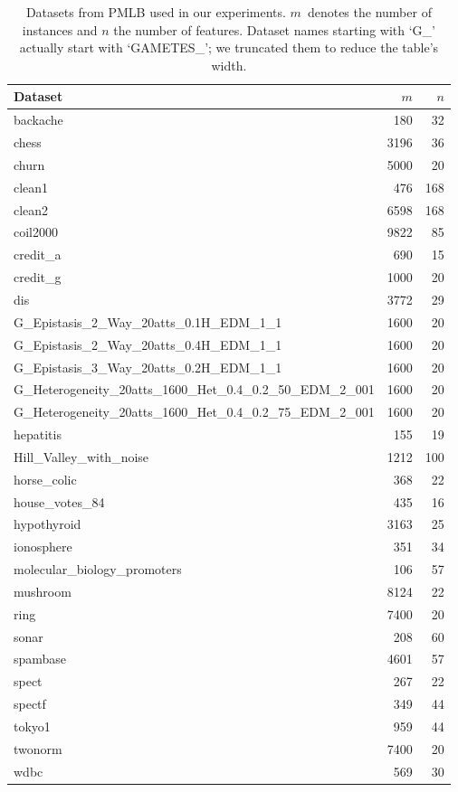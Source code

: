 \documentclass{article}
\theoremstyle{definition}
\begin{document}
\begin{table}[htbp]
	\centering
	\begin{tabular}{lrr}
		\toprule
		Dataset & $m$ & $n$ \\
		\midrule
		backache & 180 & 32 \\
		chess & 3196 & 36 \\
		churn & 5000 & 20 \\
		clean1 & 476 & 168 \\
		clean2 & 6598 & 168 \\
		coil2000 & 9822 & 85 \\
		credit\_a & 690 & 15 \\
		credit\_g & 1000 & 20 \\
		dis & 3772 & 29 \\
		G\_Epistasis\_2\_Way\_20atts\_0.1H\_EDM\_1\_1 & 1600 & 20 \\
		G\_Epistasis\_2\_Way\_20atts\_0.4H\_EDM\_1\_1 & 1600 & 20 \\
		G\_Epistasis\_3\_Way\_20atts\_0.2H\_EDM\_1\_1 & 1600 & 20 \\
		G\_Heterogeneity\_20atts\_1600\_Het\_0.4\_0.2\_50\_EDM\_2\_001 & 1600 & 20 \\
		G\_Heterogeneity\_20atts\_1600\_Het\_0.4\_0.2\_75\_EDM\_2\_001 & 1600 & 20 \\
		hepatitis & 155 & 19 \\
		Hill\_Valley\_with\_noise & 1212 & 100 \\
		horse\_colic & 368 & 22 \\
		house\_votes\_84 & 435 & 16 \\
		hypothyroid & 3163 & 25 \\
		ionosphere & 351 & 34 \\
		molecular\_biology\_promoters & 106 & 57 \\
		mushroom & 8124 & 22 \\
		ring & 7400 & 20 \\
		sonar & 208 & 60 \\
		spambase & 4601 & 57 \\
		spect & 267 & 22 \\
		spectf & 349 & 44 \\
		tokyo1 & 959 & 44 \\
		twonorm & 7400 & 20 \\
		wdbc & 569 & 30 \\
		\bottomrule
	\end{tabular}
	\caption{
		Datasets from PMLB used in our experiments.
		$m$~denotes the number of instances and $n$ the number of features.
		Dataset names starting with `G\_' actually start with `GAMETES\_'; we truncated them to reduce the table's width.
	}
	\label{tab:afs:datasets}
\end{table}
\end{document}
